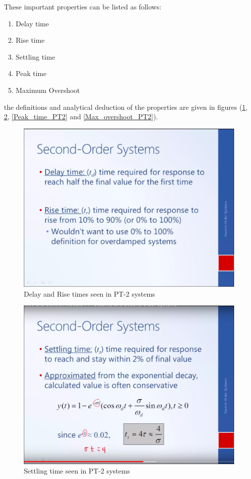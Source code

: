 These important properties can be listed as follows:
\begin{enumerate}
	\item Delay time
	\item Rise time
	\item Settling time
	\item Peak time
	\item Maximum Overshoot
\end{enumerate}
the definitions and analytical deduction of the properties are given in figures (\ref{Fig_Delay_and_Rise_PT2_Laplace}, \ref{Settling_time_PT2}, \ref{Peak_time_PT2} and \ref{Max_overshoot_PT2}).
\begin{figure}[h!]
	\centering
	\includegraphics[width=\linewidth]{Bilder/Delay_and_Rise_time_PT2}
	\caption{Delay and Rise times seen in PT-2 systems}
	\label{Fig_Delay_and_Rise_PT2_Laplace}	
\end{figure}
\clearpage
\begin{figure}[h!]
	\centering
	\includegraphics[width=\linewidth]{Bilder/Settling_time}
	\caption{Settling time seen in PT-2 systems}
	\label{Settling_time_PT2}	
\end{figure}
